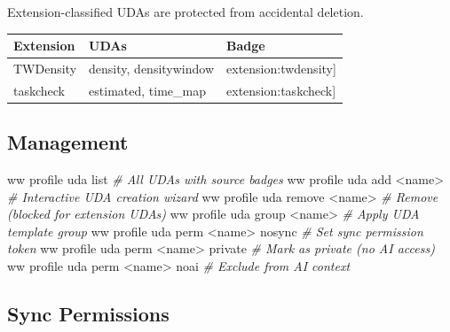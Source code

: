 \documentclass[11pt, a4paper, DIV=14]{scrartcl}
\renewcommand{\texttt}[1]{{\ttfamily\fontsize{8.5}{10.5}\selectfont\color{BabbNavy}#1}}
\newenvironment{Shaded}{%
  \vspace{4pt}%
  \begin{lrbox}{\ShadedBox}%
  \begin{minipage}{\dimexpr\linewidth-2\fboxsep\relax}%
  \vspace{4pt}%
}{%
  \vspace{4pt}%
  \end{minipage}%
  \end{lrbox}%
  \noindent\colorbox{CodeBg}{\usebox{\ShadedBox}}%
  \par\vspace{4pt}%
}
\newcommand{\CommentTok}[1]{\textcolor{BabbGray}{\textit{#1}}}
\newcommand{\ExtensionTok}[1]{#1}
\newcommand{\NormalTok}[1]{#1}
\newcommand{\OperatorTok}[1]{#1}
\newenvironment{Highlighting}{\ttfamily\fontsize{8.2}{11}\selectfont}{}
\newcounter{none}
\begin{document}
Extension-classified UDAs are protected from accidental deletion.

{\def\LTcaptype{none} %
\begin{longtable}[]{@{}lll@{}}
\toprule\noalign{}
Extension & UDAs & Badge \\
\midrule\noalign{}
\endhead
\bottomrule\noalign{}
\endlastfoot
TWDensity & \texttt{density}, \texttt{densitywindow} &
\texttt{{[}extension:twdensity{]}} \\
taskcheck & \texttt{estimated}, \texttt{time\_map} &
\texttt{{[}extension:taskcheck{]}} \\
\end{longtable}
}

\subsection{Management}\label{management}

\begin{Shaded}
\begin{Highlighting}[]
\ExtensionTok{ww}\NormalTok{ profile uda list                         }\CommentTok{\# All UDAs with source badges}
\ExtensionTok{ww}\NormalTok{ profile uda add }\OperatorTok{\textless{}}\NormalTok{name}\OperatorTok{\textgreater{}}                   \CommentTok{\# Interactive UDA creation wizard}
\ExtensionTok{ww}\NormalTok{ profile uda remove }\OperatorTok{\textless{}}\NormalTok{name}\OperatorTok{\textgreater{}}               \CommentTok{\# Remove (blocked for extension UDAs)}
\ExtensionTok{ww}\NormalTok{ profile uda group }\OperatorTok{\textless{}}\NormalTok{name}\OperatorTok{\textgreater{}}                \CommentTok{\# Apply UDA template group}
\ExtensionTok{ww}\NormalTok{ profile uda perm }\OperatorTok{\textless{}}\NormalTok{name}\OperatorTok{\textgreater{}}\NormalTok{ nosync          }\CommentTok{\# Set sync permission token}
\ExtensionTok{ww}\NormalTok{ profile uda perm }\OperatorTok{\textless{}}\NormalTok{name}\OperatorTok{\textgreater{}}\NormalTok{ private         }\CommentTok{\# Mark as private (no AI access)}
\ExtensionTok{ww}\NormalTok{ profile uda perm }\OperatorTok{\textless{}}\NormalTok{name}\OperatorTok{\textgreater{}}\NormalTok{ noai            }\CommentTok{\# Exclude from AI context}
\end{Highlighting}
\end{Shaded}

\subsection{Sync Permissions}\label{sync-permissions}
\end{document}
